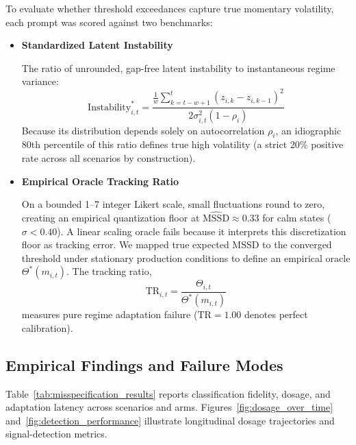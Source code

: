\documentclass[11pt,letterpaper]{article}
\begin{document}
To evaluate whether threshold exceedances capture true momentary volatility, each prompt was scored against two benchmarks:
\begin{itemize}
    \item \textbf{Standardized Latent Instability} 
    
    The ratio of unrounded, gap-free latent instability to instantaneous regime variance:
    \begin{equation}
    \text{Instability}^*_{i,t} = \frac{\frac{1}{w}\sum_{k=t-w+1}^t (z_{i,k} - z_{i,k-1})^2}{2\sigma_{i,t}^2(1 - \rho_i)}
    \end{equation}
    Because its distribution depends solely on autocorrelation $\rho_i$, an idiographic 80th percentile of this ratio defines true high volatility (a strict 20\% positive rate across all scenarios by construction).
    \item \textbf{Empirical Oracle Tracking Ratio} 
    
    On a bounded 1--7 integer Likert scale, small fluctuations round to zero, creating an empirical quantization floor at $\widehat{\text{MSSD}} \approx 0.33$ for calm states ($\sigma < 0.40$). A linear scaling oracle fails because it interprets this discretization floor as tracking error. We mapped true expected MSSD to the converged threshold under stationary production conditions to define an empirical oracle $\Theta^*(m_{i,t})$. The tracking ratio,
    \begin{equation}
    \text{TR}_{i,t} = \frac{\Theta_{i,t}}{\Theta^*(m_{i,t})}
    \end{equation}
    measures pure regime adaptation failure ($\text{TR} = 1.00$ denotes perfect calibration).
\end{itemize}

\subsection{Empirical Findings and Failure Modes}

Table~\ref{tab:misspecification_results} reports classification fidelity, dosage, and adaptation latency across scenarios and arms. Figures~\ref{fig:dosage_over_time} and~\ref{fig:detection_performance} illustrate longitudinal dosage trajectories and signal-detection metrics.
\end{document}
